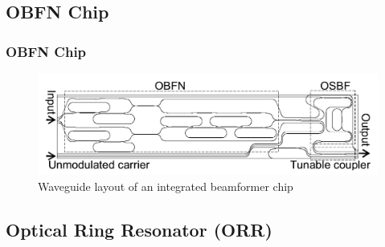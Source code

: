 \documentclass{beamer}
\begin{document}
\subsection{OBFN Chip}

\begin{frame}\frametitle{OBFN Chip}
		\begin{figure}
			\centering
			\includegraphics[width=0.8\linewidth]{images/OBFN_chip}
			\caption{Waveguide layout of an integrated beamformer chip}
			\label{fig:OBFN_chip}
		\end{figure}
\end{frame}

\subsection{Optical Ring Resonator (ORR)}
\end{document}
